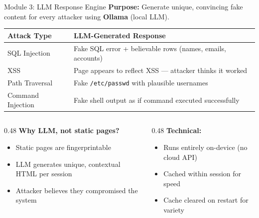 \documentclass[aspectratio=169,12pt]{beamer}
\begin{document}
\begin{frame}{Module 3: LLM Response Engine}
  \textbf{\textcolor{dcCyan}{Purpose:}} Generate unique, convincing fake content for every attacker using \textbf{Ollama} (local LLM).

  \vspace{0.3em}
  \centering\footnotesize
  \begin{tabular}{@{} l p{7.2cm} @{}}
    \toprule
    \rowcolor{dcMid}
    \textcolor{dcCyan}{Attack Type} & \textcolor{dcCyan}{LLM-Generated Response}\\
    \midrule
    SQL Injection     & Fake SQL error + believable rows (names, emails, accounts)\\
    \rowcolor{dcDark}
    XSS               & Page appears to reflect XSS --- attacker thinks it worked\\
    Path Traversal    & Fake \texttt{/etc/passwd} with plausible usernames\\
    \rowcolor{dcDark}
    Command Injection & Fake shell output as if command executed successfully\\
    \bottomrule
  \end{tabular}

  \vspace{0.4em}
  \begin{columns}[T]
    \begin{column}{0.48\textwidth}
      \textbf{\textcolor{dcGreen}{Why LLM, not static pages?}}
      \begin{itemize}\small
        \item Static pages are fingerprintable
        \item LLM generates unique, contextual HTML per session
        \item Attacker believes they compromised the system
      \end{itemize}
    \end{column}
    \begin{column}{0.48\textwidth}
      \textbf{\textcolor{dcYellow}{Technical:}}
      \begin{itemize}\small
        \item Runs entirely on-device (no cloud API)
        \item Cached within session for speed
        \item Cache cleared on restart for variety
      \end{itemize}
    \end{column}
  \end{columns}
\end{frame}
\end{document}
